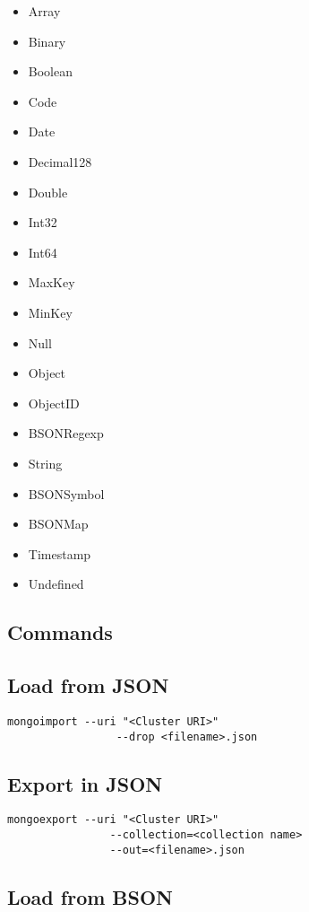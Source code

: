 \documentclass[a4paper]{article}
\begin{document}
\begin{itemize}
    \item Array
    \item Binary
    \item Boolean
    \item Code
    \item Date
    \item Decimal128
    \item Double
    \item Int32
    \item Int64
    \item MaxKey
    \item MinKey
    \item Null
    \item Object
    \item ObjectID
    \item BSONRegexp
    \item String
    \item BSONSymbol
    \item BSONMap
    \item Timestamp
    \item Undefined
\end{itemize}

\pagebreak

\subsection{Commands}

\subsection{Load from JSON}

\begin{lstlisting}[style=js]
    mongoimport --uri "<Cluster URI>"
                 --drop <filename>.json
\end{lstlisting}

\subsection{Export in JSON}

\begin{lstlisting}[style=js]
    mongoexport --uri "<Cluster URI>"
                --collection=<collection name>
                --out=<filename>.json
\end{lstlisting}

\subsection{Load from BSON}
\end{document}
